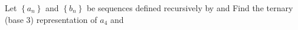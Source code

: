 Let $\left\{ a_n \right\}$ and $\left\{ b_n \right\}$ be sequences defined recursively by   and    Find the ternary (base 3) representation of $a_4$ and 